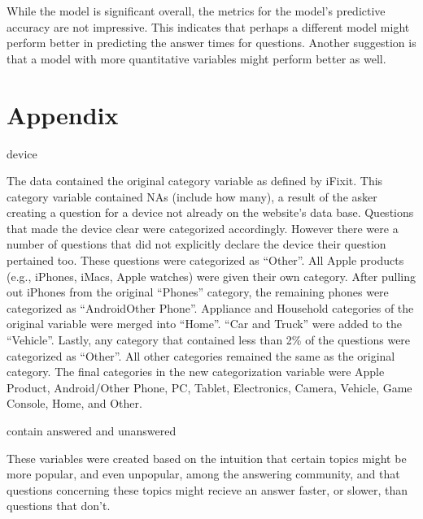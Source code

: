 \documentclass[12pt]{article}
\begin{document}
While the model is significant overall, the metrics for the model's predictive accuracy are not impressive. This indicates that perhaps a different model might perform better in predicting the answer times for questions. Another suggestion is that a model with more quantitative variables might perform better as well.  


\section{Appendix} 

device

The data contained the original category variable as defined by iFixit. This category variable contained NAs (include how many), a result of the asker creating a question for a device not already on the website's data base. Questions that made the device clear were categorized accordingly. However there were a number of questions that did not explicitly declare the device their question pertained too. These questions were categorized as ``Other''. All Apple products (e.g., iPhones, iMacs, Apple watches) were given their own category. After pulling out iPhones from the original ``Phones'' category, the remaining phones were categorized as ``AndroidOther Phone''. Appliance and Household categories of the original variable were merged into ``Home''. ``Car and Truck'' were added to the ``Vehicle''. Lastly, any category that contained less than 2\% of the questions were categorized as ``Other''. All other categories remained the same as the original category. The final categories in the new categorization variable were Apple Product, Android/Other Phone, PC, Tablet, Electronics, Camera, Vehicle, Game Console, Home, and Other. 

contain answered and unanswered

  These variables were created based on the intuition that certain topics might be more popular, and even unpopular, among the answering community, and that questions concerning these topics might recieve an answer faster, or slower, than questions that don't. 
  
\end{document}
